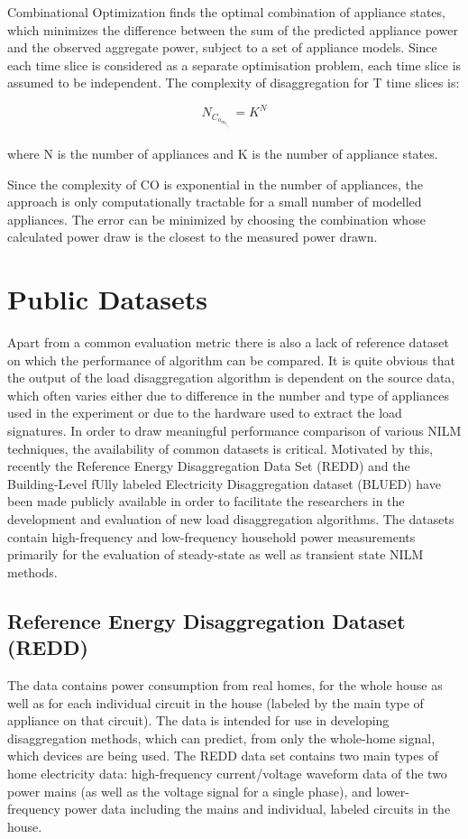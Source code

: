 Combinational Optimization finds the optimal combination of appliance states, which minimizes the difference between the sum of the predicted appliance power and the observed aggregate power, subject to a set of appliance models. Since each time slice is considered as a separate optimisation problem, each time slice is assumed to be independent.
The complexity of disaggregation for T time slices is: 

\begin{equation}
N_C_o_m_b_i_n_a_t_i_o_n_s = K ^ N
\end{equation}

where N is the number of appliances and
K is the number of appliance states.

Since the complexity of CO is exponential in the number of appliances, the approach is only computationally tractable for a small number of modelled appliances. The error can be minimized by choosing the combination whose calculated power draw is the closest to the measured power drawn.


\section{Public Datasets}

Apart from a common evaluation metric there is also a lack of reference dataset on which the
performance of algorithm can be compared. It is quite obvious that the output of the load disaggregation
algorithm is dependent on the source data, which often varies either due to difference in the number
and type of appliances used in the experiment or due to the hardware used to extract the load signatures. In order to draw meaningful performance comparison of various NILM techniques,
the availability of common datasets is critical. Motivated by this, recently the Reference Energy Disaggregation Data Set (REDD) and the Building-Level fUlly labeled Electricity Disaggregation dataset (BLUED) have been made publicly available in order to facilitate the researchers in the development and evaluation of new load disaggregation algorithms. The datasets contain high-frequency and low-frequency household power measurements primarily for the evaluation of steady-state as well as transient state NILM methods.

\subsection{Reference Energy Disaggregation Dataset (REDD)}
The data contains power consumption from real
homes, for the whole house as well as for each individual circuit in
the house (labeled by the main type of appliance on that circuit).
The data is intended for use in developing disaggregation methods, which
can predict, from only the whole-home signal, which devices are being
used. The REDD data set contains two main types of home electricity data:
high-frequency current/voltage waveform data of the two power mains
(as well as the voltage signal for a single phase), and
lower-frequency power data including the mains and individual,
labeled circuits in the house. 

